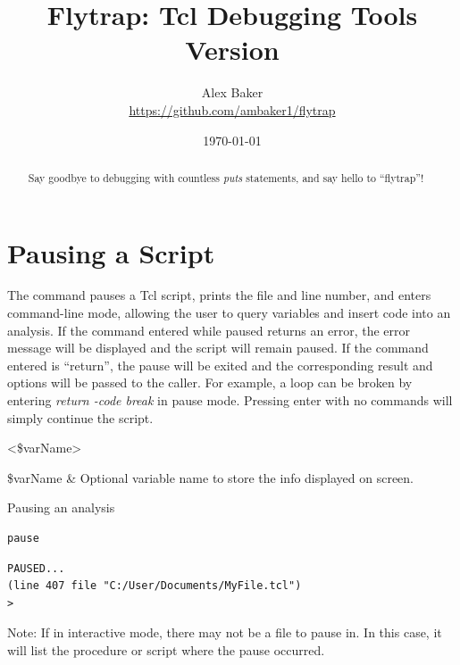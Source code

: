 \documentclass{article}
\title{\Huge Flytrap: Tcl Debugging Tools\\\small Version \version}
\author{Alex Baker\\\small\url{https://github.com/ambaker1/flytrap}}
\date{\small\today}
\renewcommand{\^}[1]{\textsuperscript{#1}}
\renewcommand{\_}[1]{\textsubscript{#1}}
\begin{document}
\maketitle
\begin{abstract}
\begin{center}
Say goodbye to debugging with countless \textit{puts} statements, and say hello to ``flytrap''!
\end{center}
\end{abstract}
\clearpage
\section{Pausing a Script} 
The  command pauses a Tcl script, prints the file and line number, and enters command-line mode, allowing the user to query variables and insert code into an analysis. 
If the command entered while paused returns an error, the error message will be displayed and the script will remain paused. 
If the command entered is ``return'', the pause will be exited and the corresponding result and options will be passed to the caller. 
For example, a loop can be broken by entering \textit{return -code break} in pause mode. 
Pressing enter with no commands will simply continue the script.
\begin{syntax}
 <\$varName>
\end{syntax}
\begin{args}
\$varName & Optional variable name to store the info displayed on screen.
\end{args}
\begin{example}{Pausing an analysis}
\begin{lstlisting}
pause
\end{lstlisting}
\tcblower
\begin{lstlisting}
PAUSED...
(line 407 file "C:/User/Documents/MyFile.tcl")
> 
\end{lstlisting}
\end{example}
Note: If in interactive mode, there may not be a file to pause in. 
In this case, it will list the procedure or script where the pause occurred.
\clearpage
\end{document}
